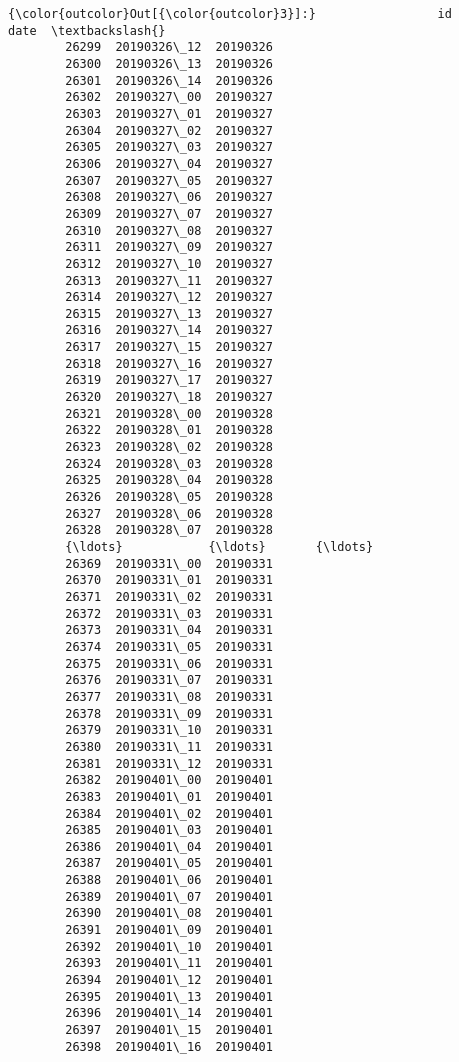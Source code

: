 \documentclass[11pt]{article}
\begin{document}
\begin{Verbatim}[commandchars=\\\{\}]
{\color{outcolor}Out[{\color{outcolor}3}]:}                 id      date  \textbackslash{}
        26299  20190326\_12  20190326   
        26300  20190326\_13  20190326   
        26301  20190326\_14  20190326   
        26302  20190327\_00  20190327   
        26303  20190327\_01  20190327   
        26304  20190327\_02  20190327   
        26305  20190327\_03  20190327   
        26306  20190327\_04  20190327   
        26307  20190327\_05  20190327   
        26308  20190327\_06  20190327   
        26309  20190327\_07  20190327   
        26310  20190327\_08  20190327   
        26311  20190327\_09  20190327   
        26312  20190327\_10  20190327   
        26313  20190327\_11  20190327   
        26314  20190327\_12  20190327   
        26315  20190327\_13  20190327   
        26316  20190327\_14  20190327   
        26317  20190327\_15  20190327   
        26318  20190327\_16  20190327   
        26319  20190327\_17  20190327   
        26320  20190327\_18  20190327   
        26321  20190328\_00  20190328   
        26322  20190328\_01  20190328   
        26323  20190328\_02  20190328   
        26324  20190328\_03  20190328   
        26325  20190328\_04  20190328   
        26326  20190328\_05  20190328   
        26327  20190328\_06  20190328   
        26328  20190328\_07  20190328   
        {\ldots}            {\ldots}       {\ldots}   
        26369  20190331\_00  20190331   
        26370  20190331\_01  20190331   
        26371  20190331\_02  20190331   
        26372  20190331\_03  20190331   
        26373  20190331\_04  20190331   
        26374  20190331\_05  20190331   
        26375  20190331\_06  20190331   
        26376  20190331\_07  20190331   
        26377  20190331\_08  20190331   
        26378  20190331\_09  20190331   
        26379  20190331\_10  20190331   
        26380  20190331\_11  20190331   
        26381  20190331\_12  20190331   
        26382  20190401\_00  20190401   
        26383  20190401\_01  20190401   
        26384  20190401\_02  20190401   
        26385  20190401\_03  20190401   
        26386  20190401\_04  20190401   
        26387  20190401\_05  20190401   
        26388  20190401\_06  20190401   
        26389  20190401\_07  20190401   
        26390  20190401\_08  20190401   
        26391  20190401\_09  20190401   
        26392  20190401\_10  20190401   
        26393  20190401\_11  20190401   
        26394  20190401\_12  20190401   
        26395  20190401\_13  20190401   
        26396  20190401\_14  20190401   
        26397  20190401\_15  20190401   
        26398  20190401\_16  20190401   
        

\end{Verbatim}
\end{document}

